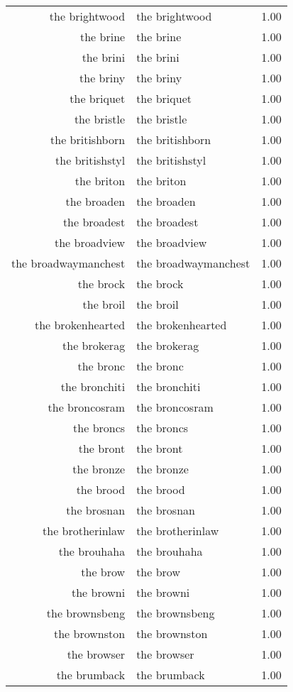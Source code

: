 \begin{table}[ht]
\begin{tabular}{rlr}
  the brightwood & the brightwood & 1.00 \\ 
  the brine & the brine & 1.00 \\ 
  the brini & the brini & 1.00 \\ 
  the briny & the briny & 1.00 \\ 
  the briquet & the briquet & 1.00 \\ 
  the bristle & the bristle & 1.00 \\ 
  the britishborn & the britishborn & 1.00 \\ 
  the britishstyl & the britishstyl & 1.00 \\ 
  the briton & the briton & 1.00 \\ 
  the broaden & the broaden & 1.00 \\ 
  the broadest & the broadest & 1.00 \\ 
  the broadview & the broadview & 1.00 \\ 
  the broadwaymanchest & the broadwaymanchest & 1.00 \\ 
  the brock & the brock & 1.00 \\ 
  the broil & the broil & 1.00 \\ 
  the brokenhearted & the brokenhearted & 1.00 \\ 
  the brokerag & the brokerag & 1.00 \\ 
  the bronc & the bronc & 1.00 \\ 
  the bronchiti & the bronchiti & 1.00 \\ 
  the broncosram & the broncosram & 1.00 \\ 
  the broncs & the broncs & 1.00 \\ 
  the bront & the bront & 1.00 \\ 
  the bronze & the bronze & 1.00 \\ 
  the brood & the brood & 1.00 \\ 
  the brosnan & the brosnan & 1.00 \\ 
  the brotherinlaw & the brotherinlaw & 1.00 \\ 
  the brouhaha & the brouhaha & 1.00 \\ 
  the brow & the brow & 1.00 \\ 
  the browni & the browni & 1.00 \\ 
  the brownsbeng & the brownsbeng & 1.00 \\ 
  the brownston & the brownston & 1.00 \\ 
  the browser & the browser & 1.00 \\ 
  the brumback & the brumback & 1.00 \\ 

\end{tabular}
\end{table}
